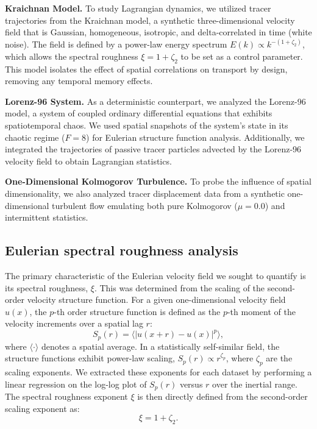 \documentclass[]{article}
\begin{document}
\noindent\textbf{Kraichnan Model.} To study Lagrangian dynamics, we utilized tracer trajectories from the Kraichnan model, a synthetic three-dimensional velocity field that is Gaussian, homogeneous, isotropic, and delta-correlated in time (white noise). The field is defined by a power-law energy spectrum $E(k) \propto k^{-(1+\zeta_2)}$, which allows the spectral roughness $\xi = 1 + \zeta_2$ to be set as a control parameter. This model isolates the effect of spatial correlations on transport by design, removing any temporal memory effects.

\noindent\textbf{Lorenz-96 System.} As a deterministic counterpart, we analyzed the Lorenz-96 model, a system of coupled ordinary differential equations that exhibits spatiotemporal chaos. We used spatial snapshots of the system's state in its chaotic regime ($F=8$) for Eulerian structure function analysis. Additionally, we integrated the trajectories of passive tracer particles advected by the Lorenz-96 velocity field to obtain Lagrangian statistics.

\noindent\textbf{One-Dimensional Kolmogorov Turbulence.} To probe the influence of spatial dimensionality, we also analyzed tracer displacement data from a synthetic one-dimensional turbulent flow emulating both pure Kolmogorov ($\mu=0.0$) and intermittent statistics.

\subsection{Eulerian spectral roughness analysis}
The primary characteristic of the Eulerian velocity field we sought to quantify is its spectral roughness, $\xi$. This was determined from the scaling of the second-order velocity structure function. For a given one-dimensional velocity field $u(x)$, the $p$-th order structure function is defined as the $p$-th moment of the velocity increments over a spatial lag $r$:
\begin{equation}
S_p(r) = \langle |u(x+r) - u(x)|^p \rangle,
\end{equation}
where $\langle \cdot \rangle$ denotes a spatial average. In a statistically self-similar field, the structure functions exhibit power-law scaling, $S_p(r) \propto r^{\zeta_p}$, where $\zeta_p$ are the scaling exponents. We extracted these exponents for each dataset by performing a linear regression on the log-log plot of $S_p(r)$ versus $r$ over the inertial range. The spectral roughness exponent $\xi$ is then directly defined from the second-order scaling exponent as:
\begin{equation}
\xi = 1 + \zeta_2.
\end{equation}
\end{document}
